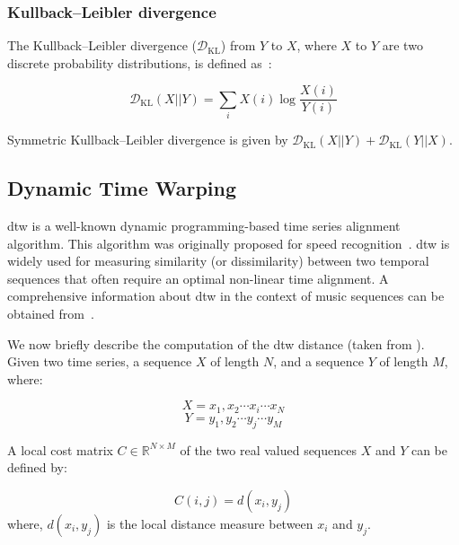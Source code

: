 \subsubsection{Kullback–Leibler divergence}
\label{sec:kl_divergence}

The Kullback–Leibler divergence ($\mathcal{D}_\mathrm{KL}$) from $Y$ to $X$, where $X$ to $Y$ are two discrete probability distributions, is defined as~\citep{kullback1951information}:

\begin{equation}
\label{eq:kl_divergence}
\mathcal{D}_\mathrm{KL}(X||Y) = \sum_{i}X(i) \log \frac{X(i)}{Y(i)}
\end{equation}

Symmetric Kullback–Leibler divergence is given by $\mathcal{D}_\mathrm{KL}(X||Y) + \mathcal{D}_\mathrm{KL}(Y||X)$.


\subsection{Dynamic Time Warping}
\label{sec_DTW_distance_measure}

\Acrfull{dtw} is a well-known dynamic programming-based time series alignment algorithm. This algorithm was originally proposed for speed recognition~\citep{Sakoe78TASLP}. \Gls{dtw} is widely used for measuring similarity (or dissimilarity) between two temporal sequences that often require an optimal non-linear time alignment. A comprehensive information about \gls{dtw} in the context of music sequences can be obtained from~\cite{muller2007dynamic}. 

We now briefly describe the computation of the \gls{dtw} distance (taken from \cite{Keogh2004,muller2007dynamic}). Given two time series, a sequence $X$ of length $N$, and a sequence $Y$ of length $M$, where:

\begin{equation}
	X = x_1, x_2 \cdots x_i \cdots x_N
\end{equation}
\begin{equation}
	Y = y_1, y_2 \cdots y_j \cdots y_M
\end{equation}

\noindent A local cost matrix $C \in \mathbb{R}^{N \times M}$ of the two real valued sequences $X$ and $Y$ can be defined by:

\begin{equation}
C(i,j) = d(x_i,y_j)
\end{equation}
\noindent where, $d(x_i,y_j)$ is the local distance measure between $x_i$ and $y_j$.

